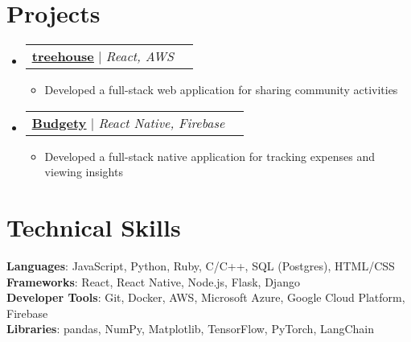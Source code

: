 \documentclass[letterpaper,11pt]{article}
\makeatletter
\newcommand{\resumeItem}[1]{
  \item\small{
    {#1 \vspace{-2pt}}
  }
}
\newcommand{\resumeProjectHeading}[2]{
    \item
    \begin{tabular*}{0.97\textwidth}{l@{\extracolsep{\fill}}r}
      \small#1 & #2 \\
    \end{tabular*}\vspace{-7pt}
}
\newcommand{\resumeSubHeadingListStart}{\begin{itemize}[leftmargin=0.15in, label={}]}
\newcommand{\resumeSubHeadingListEnd}{\end{itemize}}
\newcommand{\resumeItemListStart}{\begin{itemize}}
\newcommand{\resumeItemListEnd}{\end{itemize}\vspace{-5pt}}
\makeatother
\begin{document}
\section{Projects}
\resumeSubHeadingListStart
  \resumeProjectHeading
      {\textbf{\href{https://kenf.hashnode.dev/treehouse}{\underline{treehouse}}} $|$ \emph{React, AWS}}{}
      \resumeItemListStart
        \resumeItem{Developed a full-stack web application for sharing community activities}
      \resumeItemListEnd
  \resumeProjectHeading
      {\textbf{\href{https://github.com/duckyfuz/expense_tracker}{\underline{Budgety}}} $|$ \emph{React Native, Firebase}}{}
      \resumeItemListStart
        \resumeItem{Developed a full-stack native application for tracking expenses and viewing insights}
      \resumeItemListEnd
\resumeSubHeadingListEnd






%
\section{Technical Skills}
 \begin{itemize}[leftmargin=0.15in, label={}]
    \small{\item{
     \textbf{Languages}{: JavaScript, Python, Ruby, C/C++, SQL (Postgres), HTML/CSS} \\
     \textbf{Frameworks}{: React, React Native, Node.js, Flask, Django} \\
     \textbf{Developer Tools}{: Git, Docker, AWS, Microsoft Azure, Google Cloud Platform, Firebase} \\
     \textbf{Libraries}{: pandas, NumPy, Matplotlib, TensorFlow, PyTorch, LangChain}
    }}
 \end{itemize}


\end{document}
